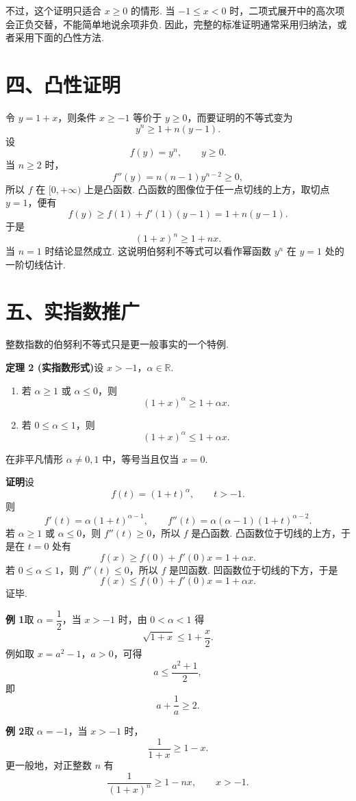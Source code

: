 \documentclass[UTF8, 12pt, fontset=fandol, oneside]{ctexart}
\begin{document}
不过，这个证明只适合 $x\ge0$ 的情形. 当 $-1\le x<0$ 时，二项式展开中的高次项会正负交替，不能简单地说余项非负. 因此，完整的标准证明通常采用归纳法，或者采用下面的凸性方法.

\section*{四、凸性证明}

令 $y=1+x$，则条件 $x\ge -1$ 等价于 $y\ge0$，而要证明的不等式变为
\[
  y^n\ge 1+n(y-1).
\]
设
\[
  f(y)=y^n,\qquad y\ge0.
\]
当 $n\ge2$ 时，
\[
  f''(y)=n(n-1)y^{n-2}\ge0,
\]
所以 $f$ 在 $[0,+\infty)$ 上是凸函数. 凸函数的图像位于任一点切线的上方，取切点 $y=1$，便有
\[
  f(y)\ge f(1)+f'(1)(y-1)=1+n(y-1).
\]
于是
\[
  (1+x)^n\ge1+nx.
\]
当 $n=1$ 时结论显然成立. 这说明伯努利不等式可以看作幂函数 $y^n$ 在 $y=1$ 处的一阶切线估计.

\section*{五、实指数推广}

整数指数的伯努利不等式只是更一般事实的一个特例.

\noindent\textbf{定理 2 (实指数形式)}\quad 设 $x>-1$，$\alpha\in\mathbb R$.
\begin{enumerate}
  \item 若 $\alpha\ge1$ 或 $\alpha\le0$，则
  \[
    (1+x)^\alpha\ge1+\alpha x.
  \]
  \item 若 $0\le\alpha\le1$，则
  \[
    (1+x)^\alpha\le1+\alpha x.
  \]
\end{enumerate}
在非平凡情形 $\alpha\ne0,1$ 中，等号当且仅当 $x=0$.

\noindent\textbf{证明}\quad 设
\[
  f(t)=(1+t)^\alpha,\qquad t>-1.
\]
则
\[
  f'(t)=\alpha(1+t)^{\alpha-1},\qquad
  f''(t)=\alpha(\alpha-1)(1+t)^{\alpha-2}.
\]
若 $\alpha\ge1$ 或 $\alpha\le0$，则 $f''(t)\ge0$，所以 $f$ 是凸函数. 凸函数位于切线的上方，于是在 $t=0$ 处有
\[
  f(x)\ge f(0)+f'(0)x=1+\alpha x.
\]
若 $0\le\alpha\le1$，则 $f''(t)\le0$，所以 $f$ 是凹函数. 凹函数位于切线的下方，于是
\[
  f(x)\le f(0)+f'(0)x=1+\alpha x.
\]
证毕.

\noindent\textbf{例 1}\quad 取 $\alpha=\dfrac12$，当 $x>-1$ 时，由 $0<\alpha<1$ 得
\[
  \sqrt{1+x}\le 1+\frac{x}{2}.
\]
例如取 $x=a^2-1$，$a>0$，可得
\[
  a\le \frac{a^2+1}{2},
\]
即
\[
  a+\frac1a\ge2.
\]

\noindent\textbf{例 2}\quad 取 $\alpha=-1$，当 $x>-1$ 时，
\[
  \frac1{1+x}\ge1-x.
\]
更一般地，对正整数 $n$ 有
\[
  \frac1{(1+x)^n}\ge1-nx,\qquad x>-1.
\]
\end{document}
